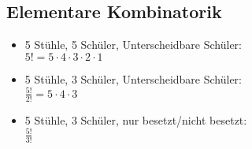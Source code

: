 \subsection{Elementare Kombinatorik}

\begin{itemize}
    \item 5 Stühle, 5 Schüler, Unterscheidbare Schüler: \\
        $5! = 5 \cdot 4 \cdot 3 \cdot 2 \cdot 1$
    \item 5 Stühle, 3 Schüler, Unterscheidbare Schüler: \\
        $\frac{5!}{2!} = 5 \cdot 4 \cdot 3$
    \item 5 Stühle, 3 Schüler, nur besetzt/nicht besetzt: \\
        $\frac{5!}{3!}$
\end{itemize}

